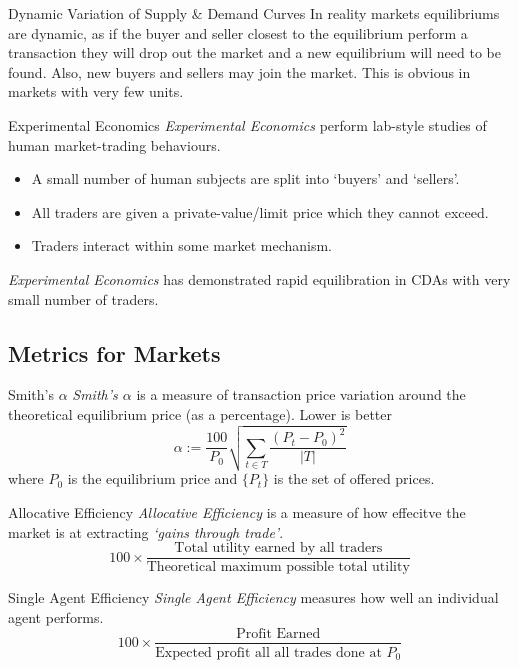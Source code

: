 \documentclass[11pt,a4paper]{article}
\begin{document}
\begin{proposition}{Dynamic Variation of Supply \& Demand Curves}
  In reality markets equilibriums are dynamic, as if the buyer and seller closest to the equilibrium perform a transaction they will drop out the market and a new equilibrium will need to be found. Also, new buyers and sellers may join the market. This is obvious in markets with very few units.
\end{proposition}

\begin{definition}{Experimental Economics}
  \textit{Experimental Economics} perform lab-style studies of human market-trading behaviours.
  \begin{itemize}
    \item A small number of human subjects are split into `buyers' and `sellers'.
    \item All traders are given a private-value/limit price which they cannot exceed.
    \item Traders interact within some market mechanism.
  \end{itemize}
  \textit{Experimental Economics} has demonstrated rapid equilibration in CDAs with very small number of traders.
\end{definition}

\subsection{Metrics for Markets}

\begin{definition}{Smith's $\alpha$}
  \textit{Smith's $\alpha$} is a measure of transaction price variation around the theoretical equilibrium price (as a percentage). Lower is better
  \[ \alpha:=\frac{100}{P_0}\sqrt{\sum_{t\in T}\frac{(P_t-P_0)^2}{|T|}} \]
  where $P_0$ is the equilibrium price and $\{P_t\}$ is the set of offered prices.
\end{definition}

\begin{definition}{Allocative Efficiency}
  \textit{Allocative Efficiency} is a measure of how effecitve the market is at extracting \textit{`gains through trade'}.
  \[ 100\times\frac{\text{Total utility earned by all traders}}{\text{Theoretical maximum possible total utility}} \]
\end{definition}

\begin{definition}{Single Agent Efficiency}
  \textit{Single Agent Efficiency} measures how well an individual agent performs.
  \[ 100\times\frac{\text{Profit Earned}}{\text{Expected profit all all trades done at }P_0} \]
\end{definition}
\end{document}

